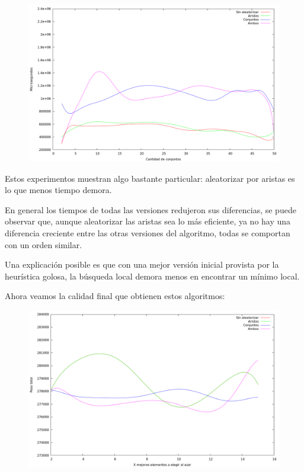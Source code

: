 \vspace*{0.5cm}

\vspace*{0.5cm}

\begin{figure}[H]
  \begin{center}
    \includegraphics[scale=0.35]{imagenes/grasp-local-k-tiempo.png}
  \end{center}
\end{figure}

\vspace*{0.5cm}

Estos experimentos muestran algo bastante particular: aleatorizar por aristas
es lo que menos tiempo demora.

En general los tiempos de todas las versiones redujeron sus diferencias, se
puede observar que, aunque aleatorizar las aristas sea lo más eficiente, ya no
hay una diferencia creciente entre las otras versiones del algoritmo, todas
se comportan con un orden similar.

Una explicación posible es que con una mejor versión inicial provista por
la heurística golosa, la búsqueda local demora menos en encontrar un mínimo
local.

Ahora veamos la calidad final que obtienen estos algoritmos:

\vspace*{0.5cm}

\begin{figure}[H]
  \begin{center}
    \includegraphics[scale=0.35]{imagenes/grasp-local-x-peso.png}
  \end{center}
\end{figure}

